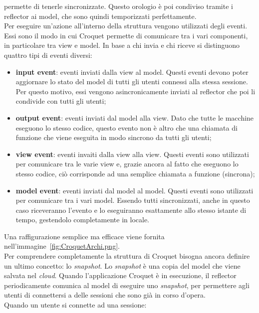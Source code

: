 permette di tenerle sincronizzate. Questo orologio è poi condiviso tramite i reflector ai model, che sono quindi temporizzati perfettamente.\\
\newline
Per eseguire un'azione all'interno della struttura vengono utilizzati degli eventi. Essi sono il modo in cui Croquet permette di comunicare tra i vari componenti, in particolare
tra view e model. In base a chi invia e chi riceve si distinguono quattro tipi di eventi diversi:
\begin{itemize}
    \item \textbf{input event}: eventi inviati dalla view al model. Questi eventi devono poter aggiornare lo stato del model di tutti gli utenti connessi alla stessa sessione. Per 
    questo motivo, essi vengono asincronicamente inviati al reflector che poi li condivide con tutti gli utenti;
    \item \textbf{output event}: eventi inviati dal model alla view. Dato che tutte le macchine eseguono lo stesso codice, questo evento non è altro che una chiamata di funzione
    che viene eseguita in modo sincrono da tutti gli utenti;
    \item \textbf{view event}: eventi invaiti dalla view alla view. Questi eventi sono utilizzati per comunicare tra le varie view e, grazie ancora al fatto che eseguono lo stesso codice,
    ciò corrisponde ad una semplice chiamata a funzione (sincrona);
    \item \textbf{model event}: eventi inviati dal model al model. Questi eventi sono utilizzati per comunicare tra i vari model. Essendo tutti sincronizzati, anche in questo caso
    riceveranno l'evento e lo eseguiranno esattamente allo stesso istante di tempo, gestendolo completamente in locale.
\end{itemize}
Una raffigurazione semplice ma efficace viene fornita nell'immagine~\ref{fig:CroquetArchi.png}.\\
\newline
{}
Per comprendere completamente la struttura di Croquet bisogna ancora definire un ultimo concetto: lo \textit{snapshot}. Lo \textit{snapshot} è una copia del model che viene salvata 
nel \textit{cloud}. Quando l'applicazione Croquet è in esecuzione, il reflector periodicamente comunica al model di eseguire uno \textit{snapshot}, per permettere agli utenti di 
connettersi a delle sessioni che sono già in corso d'opera.\\
Quando un utente si connette ad una sessione:
